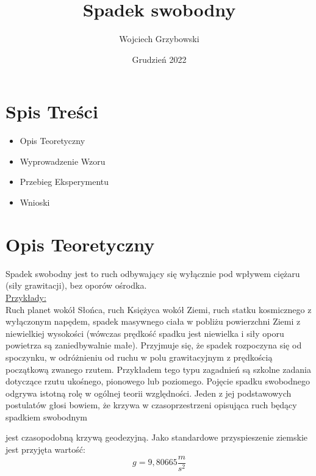 \documentclass[11.5pt, arev]{article}
\title{Spadek swobodny}
\author{Wojciech Grzybowski}
\date{Grudzień 2022}
\begin{document}

\maketitle

\section{Spis Treści}

\vspace{5mm}
\begin{itemize}

\item Opis Teoretyczny
\item Wyprowadzenie Wzoru
\item Przebieg Eksperymentu
\item Wnioski

\end{itemize}
\section{Opis Teoretyczny}
\vspace{4mm}

Spadek swobodny jest to ruch odbywający się wyłącznie pod wpływem ciężaru
(siły grawitacji), bez oporów ośrodka.
\\\underline{Przykłady:}\\

Ruch planet wokół Słońca, ruch Księżyca wokół Ziemi, ruch statku kosmicznego 
z wyłączonym napędem, spadek masywnego ciała w pobliżu powierzchni Ziemi 
z niewielkiej wysokości 
(wówczas prędkość spadku jest niewielka i siły oporu powietrza są zaniedbywalnie małe).
Przyjmuje się, że spadek rozpoczyna się od spoczynku, w odróżnieniu od ruchu 
w polu grawitacyjnym z prędkością początkową zwanego rzutem. 
Przykładem tego typu zagadnień są szkolne zadania dotyczące rzutu ukośnego, pionowego 
lub poziomego. Pojęcie spadku swobodnego odgrywa istotną rolę w ogólnej 
teorii względności. Jeden z jej podstawowych postulatów głosi bowiem,
że krzywa w czasoprzestrzeni opisująca ruch będący spadkiem swobodnym 

jest czasopodobną krzywą geodezyjną. Jako standardowe przyspieszenie ziemskie jest przyjęta wartość: \begin{equation}
    g = 9,80665 \frac{m}{s^2} \nonumber
\end{equation} 
\end{document}
